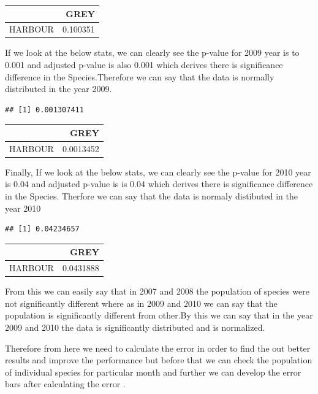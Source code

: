 \documentclass[
]{article}
\begin{document}
\begin{longtable}[]{@{}lr@{}}
\toprule
& GREY\tabularnewline
\midrule
\endhead
HARBOUR & 0.100351\tabularnewline
\bottomrule
\end{longtable}

If we look at the below stats, we can clearly see the p-value for 2009
year is to 0.001 and adjusted p-value is also 0.001 which derives there
is significance difference in the Species.Therefore we can say that the
data is normally distributed in the year 2009.

\begin{verbatim}
## [1] 0.001307411
\end{verbatim}

\begin{longtable}[]{@{}lr@{}}
\toprule
& GREY\tabularnewline
\midrule
\endhead
HARBOUR & 0.0013452\tabularnewline
\bottomrule
\end{longtable}

Finally, If we look at the below stats, we can clearly see the p-value
for 2010 year is 0.04 and adjusted p-value is is 0.04 which derives
there is significance difference in the Species. Therfore we can say
that the data is normaly distibuted in the year 2010

\begin{verbatim}
## [1] 0.04234657
\end{verbatim}

\begin{longtable}[]{@{}lr@{}}
\toprule
& GREY\tabularnewline
\midrule
\endhead
HARBOUR & 0.0431888\tabularnewline
\bottomrule
\end{longtable}

From this we can easily say that in 2007 and 2008 the population of
species were not significantly different where as in 2009 and 2010 we
can say that the population is significantly different from other.By
this we can say that in the year 2009 and 2010 the data is significantly
distributed and is normalized.

Therefore from here we need to calculate the error in order to find the
out better results and improve the performance but before that we can
check the population of individual species for particular month and
further we can develop the error bars after calculating the error .
\end{document}
